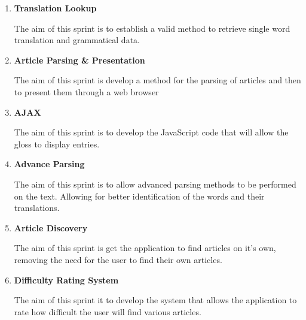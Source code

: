 \begin{enumerate}
	\item \textbf{Translation Lookup}
	
	The aim of this sprint is to establish a valid method to retrieve single word translation and grammatical data.
	
	\item \textbf{Article Parsing \& Presentation}
	
	The aim of this sprint is develop a method for the parsing of articles and then to present them through a web browser
	
	\item \textbf{AJAX}
	
	The aim of this sprint is to develop the JavaScript code that will allow the gloss to display entries.
	
	\item \textbf{Advance Parsing}
	
	The aim of this sprint is to allow advanced parsing methods to be performed on the text. Allowing for better identification of the words and their translations. 
	
	\item \textbf{Article Discovery}
	
	The aim of this sprint is get the application to find articles on it's own, removing the need for the user to find their own articles.
	
	\item \textbf{Difficulty Rating System}
	
	The aim of this sprint it to develop the system that allows the application to rate how difficult the user will find various articles. 
	
\end{enumerate}
